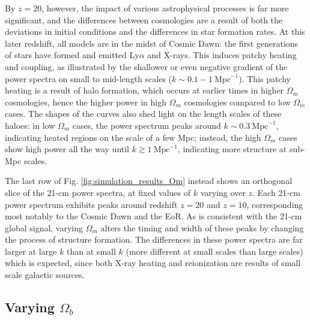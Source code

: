 \documentclass[floats,floatfix,showpacs,amssymb,prd,superscriptaddress,nofootinbib]{revtex4-2} %
\begin{document}
By $z = 20$, however, the impact of various astrophysical processes is far more significant, and the differences between cosmologies are a result of both the deviations in initial conditions and the differences in star formation rates. At this later redshift, all models are in the midst of Cosmic Dawn: the first generations of stars have formed and emitted Ly$\alpha$ and X-rays. This induces patchy heating and coupling, as illustrated by the shallower or even negative gradient of the power spectra on small to mid-length scales ($k \sim 0.1 - 1 ~\text{Mpc}^{-1}$). This patchy heating is a result of halo formation, which occurs at earlier times in higher $\Omega_m$ cosmologies, hence the higher power in high $\Omega_m$ cosmologies compared to low $\Omega_m$ cases. The shapes of the curves also shed light on the length scales of these haloes: in low $\Omega_m$ cases, the power spectrum peaks around $k \sim 0.3 ~\text{Mpc}^{-1}$, indicating heated regions on the scale of a few Mpc; instead, the high $\Omega_m$ cases show high power all the way until $k \gtrsim 1 ~\text{Mpc}^{-1}$, indicating more structure at sub-Mpc scales. 



The last row of Fig. \ref{fig:simulation_results_Om} instead shows an orthogonal slice of the 21-cm power spectra, at fixed values of $k$ varying over $z$. Each 21-cm power spectrum exhibits peaks around redshift $z = 20$ and $z = 10$, corresponding most notably to the Cosmic Dawn and the EoR. As is consistent with the 21-cm global signal, varying $\Omega_m$ alters the timing and width of these peaks by changing the process of structure formation. The differences in these power spectra are far larger at large $k$ than at small $k$ (more different at small scales than large scales) which is expected, since both X-ray heating and reionization are results of small scale galactic sources. 


\subsection{Varying $\Omega_b$}
\end{document}
